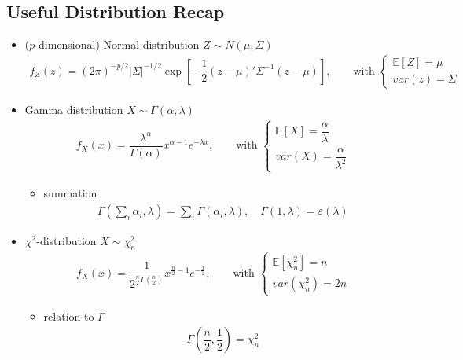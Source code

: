 \subsection{Useful Distribution Recap}
\begin{itemize}[topsep=2pt,itemsep=0pt]
    \item ($ p $-dimensional) Normal distribution $ Z\sim N(\mu ,\Sigma ) $
    \begin{align}
        f_Z(z)=(2\pi)^{-p/2}|\Sigma |^{-1/2} \exp\left[ -\dfrac{1}{2}(z-\mu )'\Sigma ^{-1}(z-\mu ) \right],\qquad \text{with }\begin{cases}
            \mathbb{E}\left[ Z \right]=\mu\\
            var(z)=\Sigma  
        \end{cases} 
    \end{align}   
    
    
    
    \item Gamma distribution $ X\sim \Gamma (\alpha ,\lambda ) $
    \begin{align}
         f_X(x)=\dfrac{\lambda ^\alpha }{\Gamma (\alpha )}x^{\alpha -1}e^{-\lambda x},\qquad \text{with }  \begin{cases}
            \mathbb{E}\left[ X \right] =\dfrac{\alpha }{\lambda }\\
            var(X)=\dfrac{\alpha }{\lambda ^2} 
         \end{cases}  
    \end{align}

    \begin{itemize}[topsep=2pt,itemsep=0pt]
        \item summation
        \begin{align}
            \Gamma (\sum_{i}\alpha _i ,\lambda )=\sum_{i} \Gamma (\alpha _i,\lambda ),\quad \Gamma (1,\lambda )=\varepsilon (\lambda ) 
        \end{align}
        
    \end{itemize}
    \item $ \chi^2 $-distribution $ X\sim \chi^2_n $
        \begin{align}
            f_X(x)=\dfrac{1}{2^{\frac{n}{2}\Gamma (\frac{n}{2})}}x^{\frac{n}{2}-1}e^{-\frac{x}{2}} ,\qquad \text{with }  \begin{cases}
                \mathbb{E}\left[ \chi^2_n \right] =n\\
                 var(\chi^2_n)=2n 
            \end{cases}
        \end{align}
        \begin{itemize}[topsep=2pt,itemsep=0pt]
            \item relation to $ \Gamma  $
        \begin{align}
            \Gamma (\dfrac{n}{2},\dfrac{1}{2})=\chi^2_n 
        \end{align}
        \end{itemize}
        

\end{itemize}
